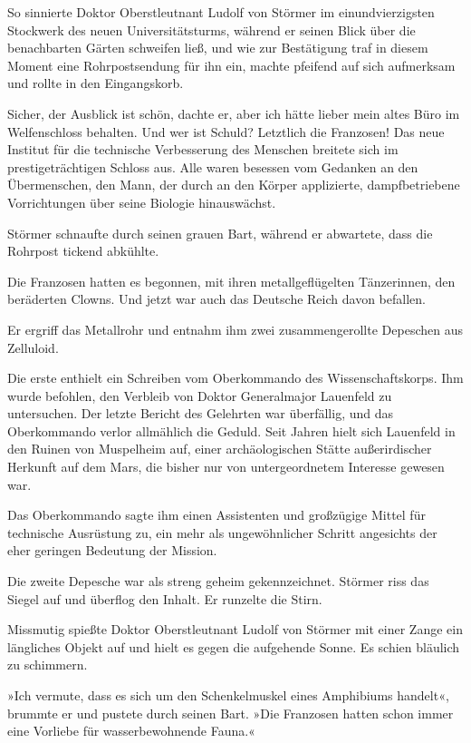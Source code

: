 So sinnierte Doktor Oberstleutnant Ludolf von Störmer im
einundvierzigsten Stockwerk des neuen Universitätsturms, während er
seinen Blick über die benachbarten Gärten schweifen ließ, und wie
zur Bestätigung traf in diesem Moment eine Rohrpostsendung für ihn
ein, machte pfeifend auf sich aufmerksam und rollte in den
Eingangskorb.

Sicher, der Ausblick ist schön, dachte er, aber ich hätte lieber
mein altes Büro im Welfenschloss behalten. Und wer ist Schuld?
Letztlich die Franzosen! Das neue Institut für die technische
Verbesserung des Menschen breitete sich im prestigeträchtigen
Schloss aus. Alle waren besessen vom Gedanken an den Übermenschen,
den Mann, der durch an den Körper applizierte, dampfbetriebene
Vorrichtungen über seine Biologie hinauswächst.

Störmer schnaufte durch seinen grauen Bart, während er abwartete,
dass die Rohrpost tickend abkühlte.

Die Franzosen hatten es begonnen, mit ihren metallgeflügelten
Tänzerinnen, den beräderten Clowns. Und jetzt war auch das Deutsche
Reich davon befallen.

Er ergriff das Metallrohr und entnahm ihm zwei zusammengerollte
Depeschen aus Zelluloid.

Die erste enthielt ein Schreiben vom Oberkommando des
Wissenschaftskorps. Ihm wurde befohlen, den Verbleib von Doktor
Generalmajor Lauenfeld zu untersuchen. Der letzte Bericht des
Gelehrten war überfällig, und das Oberkommando verlor allmählich
die Geduld. Seit Jahren hielt sich Lauenfeld in den Ruinen von
Muspelheim auf, einer archäologischen Stätte außerirdischer
Herkunft auf dem Mars, die bisher nur von untergeordnetem Interesse
gewesen war.

Das Oberkommando sagte ihm einen Assistenten und großzügige Mittel
für technische Ausrüstung zu, ein mehr als ungewöhnlicher Schritt
angesichts der eher geringen Bedeutung der Mission.

Die zweite Depesche war als streng geheim gekennzeichnet. Störmer
riss das Siegel auf und überflog den Inhalt. Er runzelte die
Stirn.

\tb

Missmutig spießte Doktor Oberstleutnant Ludolf von Störmer mit
einer Zange ein längliches Objekt auf und hielt es gegen die
aufgehende Sonne. Es schien bläulich zu schimmern.

»Ich vermute, dass es sich um den Schenkelmuskel eines Amphibiums
handelt«, brummte er und pustete durch seinen Bart. »Die Franzosen
hatten schon immer eine Vorliebe für wasserbewohnende Fauna.«

